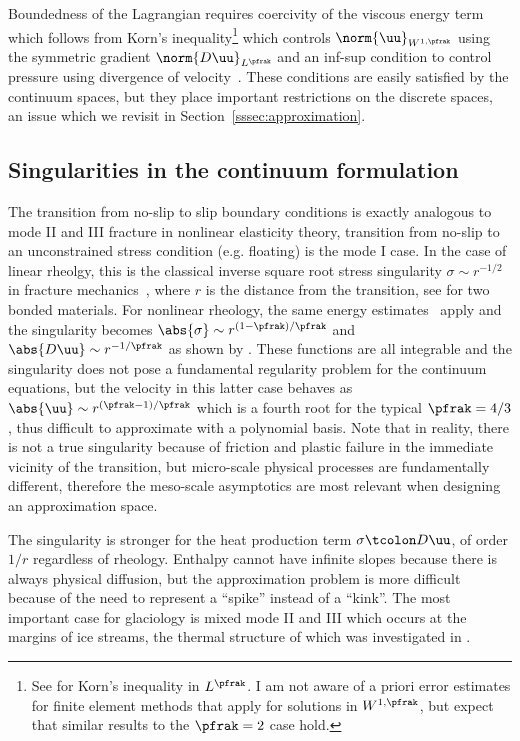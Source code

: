 Boundedness of the Lagrangian requires coercivity of the viscous energy term which follows from Korn's inequality\footnote{%
See \citet{kondratev1988boundary} for Korn's inequality in $L^\pfrak$.
I am not aware of a priori error estimates for finite element methods that apply for solutions in $W^{1,\pfrak}$, but expect that similar results to the $\pfrak=2$ case hold.}
which controls $\norm{\uu}_{W^{1,\pfrak}}$ using the symmetric gradient $\norm{D\uu}_{L^\pfrak}$ and an inf-sup condition to control pressure using divergence of velocity~\citep{evans1998partial,brenner2008mathematical}.
These conditions are easily satisfied by the continuum spaces, but they place important restrictions on the discrete spaces, an issue which we revisit in Section~\ref{sssec:approximation}.

\subsection{Singularities in the continuum formulation}\label{sec:regularity:singular}
The transition from no-slip to slip boundary conditions is exactly analogous to mode II and III fracture in nonlinear elasticity theory, transition from no-slip to an unconstrained stress condition (e.g. floating) is the mode I case.
In the case of linear rheolgy, this is the classical inverse square root stress singularity $\sigma \sim r^{-1/2}$ in fracture mechanics~\citep{anderson2005fracture}, where $r$ is the distance from the transition, see \citet{erdogan1973two} for two bonded materials.
For nonlinear rheology, the same energy estimates~\citep{rice1968path} apply and the singularity becomes $\abs{\sigma} \sim r^{(1-\pfrak)/\pfrak}$ and $\abs{D\uu} \sim r^{-1/\pfrak}$ as shown by \citet{rice1968plane,hutchinson1968singular}. 
These functions are all integrable and the singularity does not pose a fundamental regularity problem for the continuum equations, but the velocity in this latter case behaves as $\abs{\uu} \sim r^{(\pfrak-1)/\pfrak}$ which is a fourth root for the typical $\pfrak = 4/3$, thus difficult to approximate with a polynomial basis.
Note that in reality, there is not a true singularity because of friction and plastic failure in the immediate vicinity of the transition, but micro-scale physical processes are fundamentally different, therefore the meso-scale asymptotics are most relevant when designing an approximation space.

The singularity is stronger for the heat production term $\sigma\tcolon D\uu$, of order $1/r$ regardless of rheology.
Enthalpy cannot have infinite slopes because there is always physical diffusion, but the approximation problem is more difficult because of the need to represent a ``spike'' instead of a ``kink''.
The most important case for glaciology is mixed mode II and III which occurs at the margins of ice streams, the thermal structure of which was investigated in \citet{jacobson1998thermal,raymond2000energy}.

